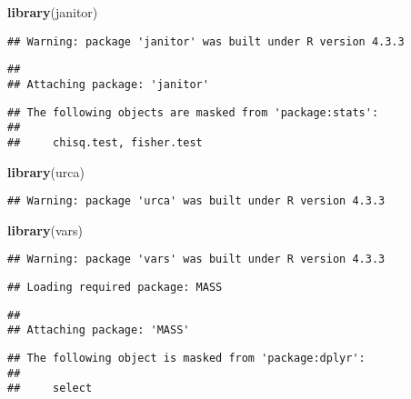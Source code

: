 \documentclass[
]{article}
\newenvironment{Shaded}{\begin{snugshade}}{\end{snugshade}}
\newcommand{\FunctionTok}[1]{\textcolor[rgb]{0.13,0.29,0.53}{\textbf{#1}}}
\newcommand{\NormalTok}[1]{#1}
\begin{document}
\begin{Shaded}
\begin{Highlighting}[]
\FunctionTok{library}\NormalTok{(janitor)}
\end{Highlighting}
\end{Shaded}

\begin{verbatim}
## Warning: package 'janitor' was built under R version 4.3.3
\end{verbatim}

\begin{verbatim}
## 
## Attaching package: 'janitor'
\end{verbatim}

\begin{verbatim}
## The following objects are masked from 'package:stats':
## 
##     chisq.test, fisher.test
\end{verbatim}

\begin{Shaded}
\begin{Highlighting}[]
\FunctionTok{library}\NormalTok{(urca)}
\end{Highlighting}
\end{Shaded}

\begin{verbatim}
## Warning: package 'urca' was built under R version 4.3.3
\end{verbatim}

\begin{Shaded}
\begin{Highlighting}[]
\FunctionTok{library}\NormalTok{(vars)}
\end{Highlighting}
\end{Shaded}

\begin{verbatim}
## Warning: package 'vars' was built under R version 4.3.3
\end{verbatim}

\begin{verbatim}
## Loading required package: MASS
\end{verbatim}

\begin{verbatim}
## 
## Attaching package: 'MASS'
\end{verbatim}

\begin{verbatim}
## The following object is masked from 'package:dplyr':
## 
##     select
\end{verbatim}
\end{document}
